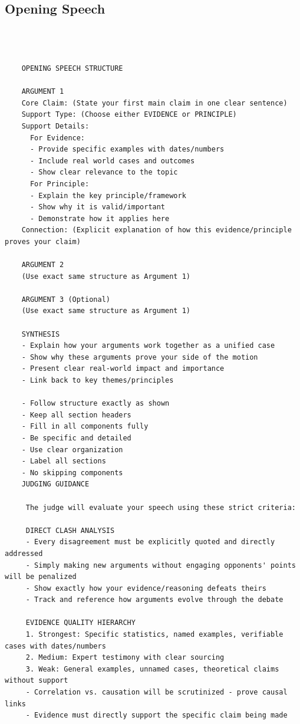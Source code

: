 \documentclass{article}
\begin{document}
\subsection{Opening Speech}
\begin{verbatim}



    OPENING SPEECH STRUCTURE

    ARGUMENT 1
    Core Claim: (State your first main claim in one clear sentence)
    Support Type: (Choose either EVIDENCE or PRINCIPLE)
    Support Details:
      For Evidence:
      - Provide specific examples with dates/numbers
      - Include real world cases and outcomes
      - Show clear relevance to the topic
      For Principle:
      - Explain the key principle/framework
      - Show why it is valid/important
      - Demonstrate how it applies here
    Connection: (Explicit explanation of how this evidence/principle proves your claim)

    ARGUMENT 2
    (Use exact same structure as Argument 1)

    ARGUMENT 3 (Optional)
    (Use exact same structure as Argument 1)

    SYNTHESIS
    - Explain how your arguments work together as a unified case
    - Show why these arguments prove your side of the motion
    - Present clear real-world impact and importance
    - Link back to key themes/principles

    - Follow structure exactly as shown
    - Keep all section headers
    - Fill in all components fully
    - Be specific and detailed
    - Use clear organization
    - Label all sections
    - No skipping components
    JUDGING GUIDANCE

     The judge will evaluate your speech using these strict criteria:

     DIRECT CLASH ANALYSIS
     - Every disagreement must be explicitly quoted and directly addressed
     - Simply making new arguments without engaging opponents' points will be penalized
     - Show exactly how your evidence/reasoning defeats theirs
     - Track and reference how arguments evolve through the debate

     EVIDENCE QUALITY HIERARCHY
     1. Strongest: Specific statistics, named examples, verifiable cases with dates/numbers
     2. Medium: Expert testimony with clear sourcing
     3. Weak: General examples, unnamed cases, theoretical claims without support
     - Correlation vs. causation will be scrutinized - prove causal links
     - Evidence must directly support the specific claim being made


\end{verbatim}
\end{document}
